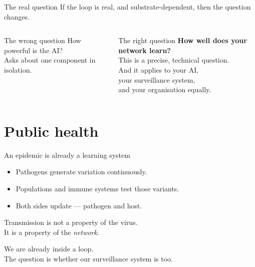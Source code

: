 \documentclass[aspectratio=169, 10pt]{beamer}
\begin{document}
\begin{frame}{The real question}
  If the loop is real, and substrate-dependent, then the question changes.

  \bigskip
  \begin{columns}[c]
      \begin{block}{The wrong question}
        \centering
        How powerful is the AI?\\[0.3em]
        \small Asks about one component in isolation.
      \end{block}

      \begin{alertblock}{The right question}
        \centering\large
        \textbf{How well does your network learn?}\\[0.3em]
        \normalsize
        This is a precise, technical question.\\
        And it applies to your AI,\\
        your surveillance system,\\
        and your organisation equally.
      \end{alertblock}
  \end{columns}
\end{frame}

\section{Public health}

\begin{frame}{An epidemic is already a learning system}
  \begin{itemize}
    \item Pathogens generate variation continuously.
    \item Populations and immune systems test those variants.
    \item Both sides update — pathogen and host.
  \end{itemize}

  \bigskip
  Transmission is not a property of the virus.\\
  It is a property of the \textit{network}.

  \bigskip
  \begin{alertblock}{}
    \centering
    We are already inside a loop.\\
    The question is whether our surveillance system is too.
  \end{alertblock}
\end{frame}
\end{document}
